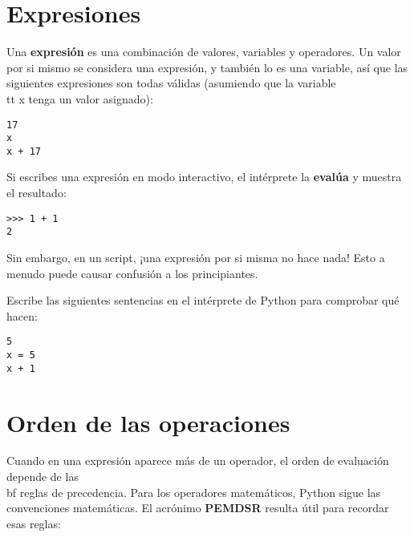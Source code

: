 \section{Expresiones}

Una {\bf expresión} es una combinación de valores, variables y operadores.
Un valor por si mismo se considera una expresión, y también lo es
una variable, así que las siguientes expresiones son todas válidas
(asumiendo que la variable {\\tt x} tenga un valor asignado):


\beforeverb
\begin{verbatim}
17
x
x + 17
\end{verbatim}
\afterverb
%
Si escribes una expresión en modo interactivo, el intérprete la
{\bf evalúa} y muestra el resultado:

\beforeverb
\begin{verbatim}
>>> 1 + 1
2
\end{verbatim}
\afterverb
%
Sin embargo, en un script, ¡una expresión por si misma no hace nada!
Esto a menudo puede causar confusión
a los principiantes.

\begin{ex}
Escribe las siguientes sentencias en el intérprete de Python para comprobar
qué hacen:

\beforeverb
\begin{verbatim}
5
x = 5
x + 1
\end{verbatim}
\afterverb
%
\end{ex}


\section{Orden de las operaciones}

Cuando en una expresión aparece más de un operador, el orden de
evaluación depende de las {\\bf reglas de precedencia}. Para los
operadores matemáticos, Python sigue las convenciones matemáticas.
El acrónimo {\bf PEMDSR} resulta útil para
recordar esas reglas:


